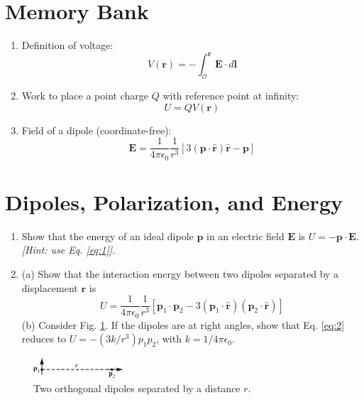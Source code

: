 \documentclass[12pt]{article}
\begin{document}
\maketitle
\small
\section{Memory Bank}
\begin{enumerate}
\item Definition of voltage:
\begin{equation}
V(\mathbf{r}) = - \int_\mathcal{O}^{\mathbf{r}} \mathbf{E} \cdot d\mathbf{l} \label{eq:1}
\end{equation}
\item Work to place a point charge $Q$ with reference point at infinity:
\begin{equation}
U = QV(\mathbf{r})
\end{equation}
\item Field of a dipole (coordinate-free): 
\begin{equation}
\mathbf{E} = \frac{1}{4\pi\epsilon_0}\frac{1}{r^3}\left[ 3(\mathbf{p}\cdot\hat{\mathbf{r}})\hat{\mathbf{r}} - \mathbf{p}\right]
\end{equation}
\end{enumerate}

\section{Dipoles, Polarization, and Energy}

\begin{enumerate}
\item Show that the energy of an ideal dipole $\mathbf{p}$ in an electric field $\mathbf{E}$ is $U = -\mathbf{p} \cdot \mathbf{E}$. \textit{[Hint: use Eq. \ref{eq:1}].} \\ \vspace{2cm}
\item (a) Show that the interaction energy between two dipoles separated by a displacement $\mathbf{r}$ is 
\begin{equation}
U = \frac{1}{4\pi\epsilon_0}\frac{1}{r^3}\left[\mathbf{p}_1 \cdot \mathbf{p}_2 - 3(\mathbf{p}_1\cdot\hat{\mathbf{r}})(\mathbf{p}_2\cdot\hat{\mathbf{r}})\right] \label{eq:2}
\end{equation}
(b) Consider Fig. \ref{fig:1}.  If the dipoles are at right angles, show that Eq. \ref{eq:2} reduces to $U = -(3k/r^3) p_1 p_2$, with $k = 1/4\pi\epsilon_0$.
\end{enumerate}

\begin{figure}
\centering
\includegraphics[width=0.3\textwidth]{figures/4_6.jpg}
\caption{\label{fig:1} Two orthogonal dipoles separated by a distance $r$.}
\end{figure}
\end{document}
